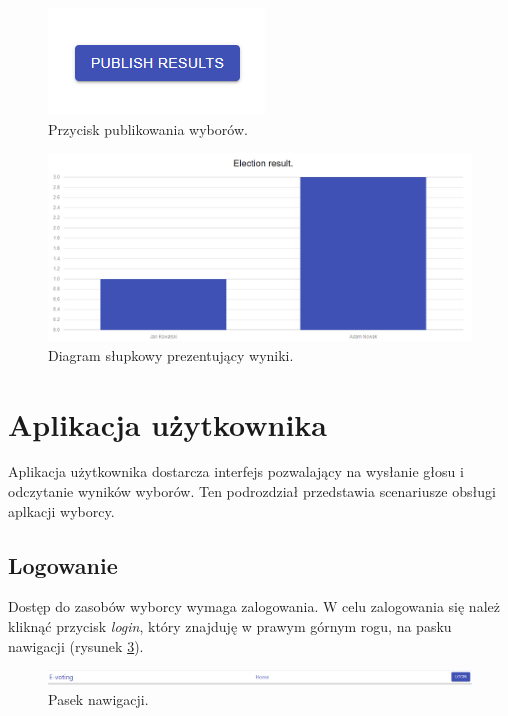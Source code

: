 \documentclass[a4paper,12pt]{book}
\begin{document}
\begin{figure}[H]
	\centering
	\includegraphics{images/publish.png}
	\caption{Przycisk publikowania wyborów.}\label{publish}
\end {figure}

\begin{figure}[H]
	\centering
	\includegraphics[width=\textwidth]{images/adminelectionresult.png}
	\caption{Diagram słupkowy prezentujący wyniki.}\label{adminelectionresult}
\end {figure}
\newpage
\section{Aplikacja użytkownika}

Aplikacja użytkownika dostarcza interfejs pozwalający na wysłanie głosu i odczytanie wyników wyborów. Ten podrozdział przedstawia scenariusze obsługi aplkacji wyborcy.

\subsection{Logowanie}

Dostęp do zasobów wyborcy wymaga zalogowania. W celu zalogowania się należ kliknąć przycisk \textit{login}, który znajduję w prawym górnym rogu, na pasku nawigacji (rysunek \ref{navlogin}).

\begin{figure}[h]
	\centering
	\includegraphics[width=\textwidth]{images/navlogin.png}
	\caption{Pasek nawigacji.}\label{navlogin}
\end {figure}
\end{document}
